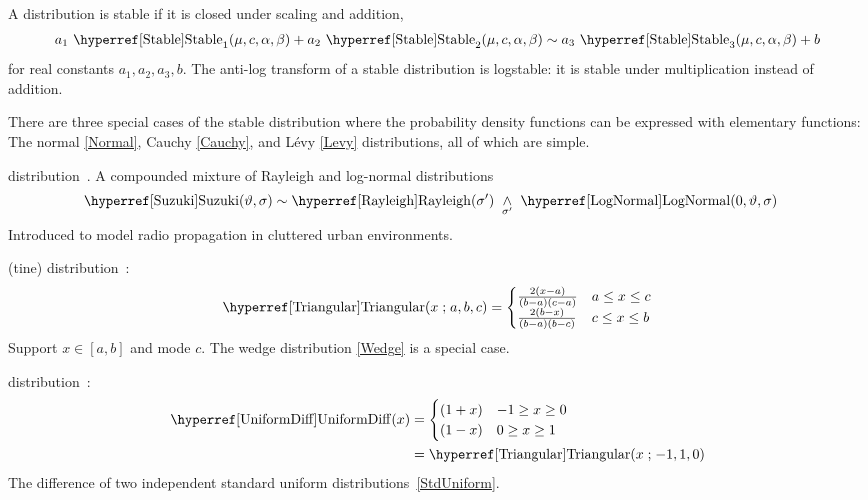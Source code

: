 A distribution is stable if it is closed under scaling and addition, 
\begin{align*}
a_1\, \opr{Stable}_1(\mu,c,\alpha,\beta) + a_2\, \opr{Stable}_2(\mu,c,\alpha,\beta) 
 \sim a_3 \,\opr{Stable}_3(\mu,c,\alpha,\beta) + b \checked
\end{align*}
for real  constants $a_1,a_2,a_3,b$. The anti-log transform of a stable distribution is logstable: it is stable under multiplication instead of addition.


There are three special cases of the stable distribution where the probability density functions can be expressed with elementary functions: The  normal \eqref{Normal}, Cauchy \eqref{Cauchy}, and L\'evy \eqref{Levy} distributions, all of which are simple.




\secbreak
{}  distribution~\cite{Suzuki1977}. A compounded mixture of Rayleigh and log-normal distributions
\begin{align}
\label{Suzuki}
\opr{Suzuki}(\vartheta,\sigma) & \sim \opr{Rayleigh}(\sigma') \mix{\sigma'} \opr{LogNormal}(0, \vartheta,\sigma) 
\checked
\end{align}
Introduced to model radio propagation in cluttered urban environments.


\secbreak
{} (tine) distribution~\cite{Evans2000}:
\begin{align}
\label{Triangular}
\opr{Triangular}(x\given a,b,c) = 
\begin{cases}
\frac{2 (x-a)}{(b-a)(c-a)} & a\leq x \leq c \checked \\
\frac{2 (b-x)}{(b-a)(b-c)} & c\leq x \leq b \checked
\end{cases}
\end{align}
Support $x\in[a,b]$ and mode $c$. The wedge distribution \eqref{Wedge} is a special case.


\secbreak
{} distribution~\cite{Springer1979a}:
\begin{align}
\label{UniformDiff}
\opr{UniformDiff}(x) \checked & = 
\begin{cases}
(1+x) & -1\geq x \geq 0 \\
(1-x) & 0\geq x \geq 1
\end{cases}
\\ \notag & = \opr{Triangular}(x\given -1,1,0) \checked
\end{align}
The difference of two independent standard uniform distributions~\eqref{StdUniform}.






